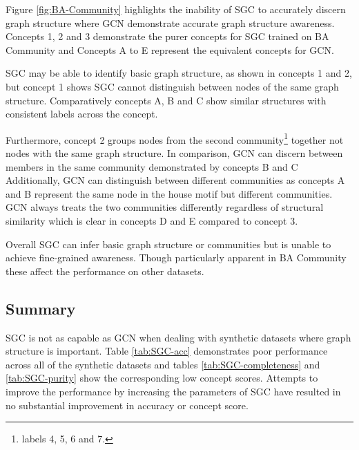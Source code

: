 Figure \ref{fig:BA-Community} highlights the inability of SGC to accurately discern graph structure where GCN demonstrate accurate graph structure awareness.
Concepts 1, 2 and 3 demonstrate the purer concepts for SGC trained on BA Community and Concepts A to E represent the equivalent concepts for GCN.

SGC may be able to identify basic graph structure, as shown in concepts 1 and 2, but concept 1 shows SGC cannot distinguish between nodes of the same graph structure.
Comparatively concepts A, B and C show similar structures with consistent labels across the concept.

Furthermore, concept 2 groups nodes from the second community\footnote{labels 4, 5, 6 and 7.} together not nodes with the same graph structure.
In comparison, GCN can discern between members in the same community demonstrated by concepts B and C
Additionally, GCN can distinguish between different communities as concepts A and B represent the same node in the house motif but different communities.
GCN always treats the two communities differently regardless of structural similarity which is clear in concepts D and E compared to concept 3.

Overall SGC can infer basic graph structure or communities but is unable to achieve fine-grained awareness.
Though particularly apparent in BA Community these affect the performance on other datasets.

\subsection{Summary}

SGC is not as capable as GCN when dealing with synthetic datasets where graph structure is important.
Table \ref{tab:SGC-acc} demonstrates poor performance across all of the synthetic datasets and tables \ref{tab:SGC-completeness} and \ref{tab:SGC-purity} show the corresponding low concept scores.
Attempts to improve the performance by increasing the parameters of SGC have resulted in no substantial improvement in accuracy or concept score.

